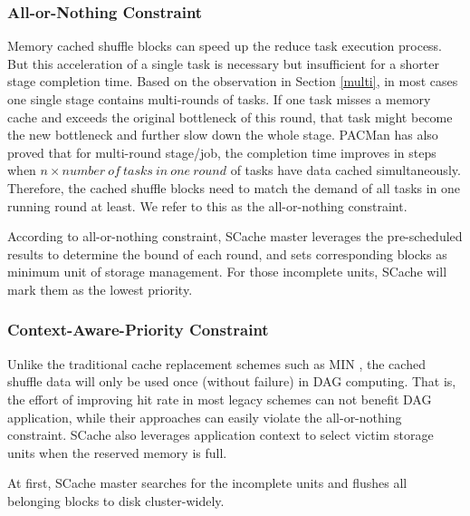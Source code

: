 \subsubsection{All-or-Nothing Constraint}
Memory cached shuffle blocks can speed up the reduce task execution process. But this acceleration of a single task is necessary but insufficient for a shorter stage completion time. Based on the observation in Section \ref{multi}, in most cases one single stage contains multi-rounds of tasks. If one task misses a memory cache and exceeds the original bottleneck of this round, that task might become the new bottleneck and further slow down the whole stage. PACMan \cite{pacman} has also proved that for multi-round stage/job, the completion time improves in steps when $n\times number\ of\ tasks\ in\ one\ round$ of tasks have data cached simultaneously. Therefore, the cached shuffle blocks need to match the demand of all tasks in one running round at least. We refer to this as the all-or-nothing constraint.

According to all-or-nothing constraint, SCache master leverages the pre-scheduled results to determine the bound of each round, and sets corresponding blocks as minimum unit of storage management.
For those incomplete units, SCache will mark them as the lowest priority.

\subsubsection{Context-Aware-Priority Constraint}
Unlike the traditional cache replacement schemes such as MIN \cite{min}, the cached shuffle data will only be used once (without failure) in DAG computing. That is, the effort of improving hit rate in most legacy schemes can not benefit DAG application, while their approaches can easily violate the all-or-nothing constraint.
SCache also leverages application context to select victim storage units when the reserved memory is full.

At first, SCache master searches for the incomplete units and flushes all belonging blocks to disk cluster-widely.

